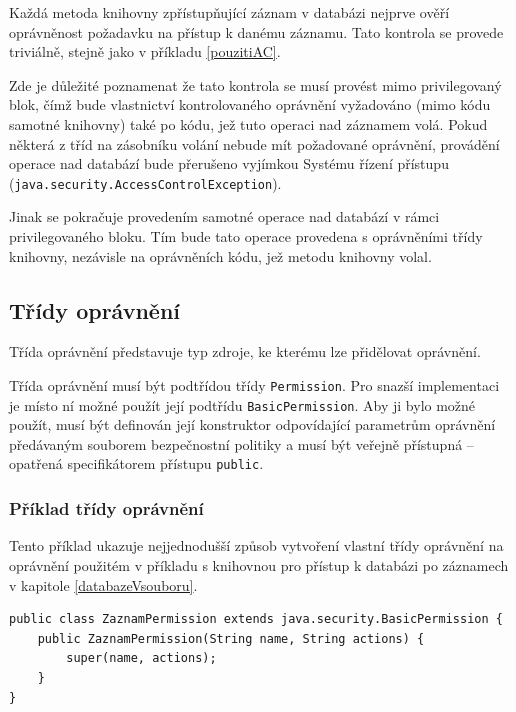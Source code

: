 Každá metoda knihovny zpřístupňující záznam v databázi nejprve ověří oprávněnost požadavku na přístup k danému záznamu. Tato kontrola se provede triviálně, stejně jako v příkladu \ref{pouzitiAC}.

Zde je důležité poznamenat že tato kontrola se musí provést mimo privilegovaný blok, čímž bude vlastnictví kontrolovaného oprávnění vyžadováno (mimo kódu samotné knihovny) také po kódu, jež tuto operaci nad záznamem volá. Pokud některá z tříd na zásobníku volání nebude mít požadované oprávnění, provádění operace nad databází bude přerušeno vyjímkou Systému řízení přístupu ({\tt java.security.AccessControlException}).

Jinak se pokračuje provedením samotné operace nad databází v rámci privilegovaného bloku. Tím bude tato operace provedena s oprávněními třídy knihovny, nezávisle na oprávněních kódu, jež metodu knihovny volal.

\subsection{Třídy oprávnění}

Třída oprávnění představuje typ zdroje, ke kterému lze přidělovat oprávnění.

Třída oprávnění musí být podtřídou třídy {\tt Permission}. Pro snazší implementaci je místo ní možné použít její podtřídu {\tt BasicPermission}.
Aby ji bylo možné použít, musí být definován její konstruktor odpovídající parametrům oprávnění předávaným souborem bezpečnostní politiky a musí být veřejně přístupná -- opatřená specifikátorem přístupu {\tt public}.

\subsubsection{Příklad třídy oprávnění}

Tento příklad ukazuje nejjednodušší způsob vytvoření vlastní třídy oprávnění na oprávnění použitém v příkladu s knihovnou pro přístup k databázi po záznamech v kapitole \ref{databazeVsouboru}.

\begin{lstlisting}[caption=Demonstrační třída oprávnění, label=prikladOpravneni]
public class ZaznamPermission extends java.security.BasicPermission {
    public ZaznamPermission(String name, String actions) {
        super(name, actions);
    }
}
\end{lstlisting}

